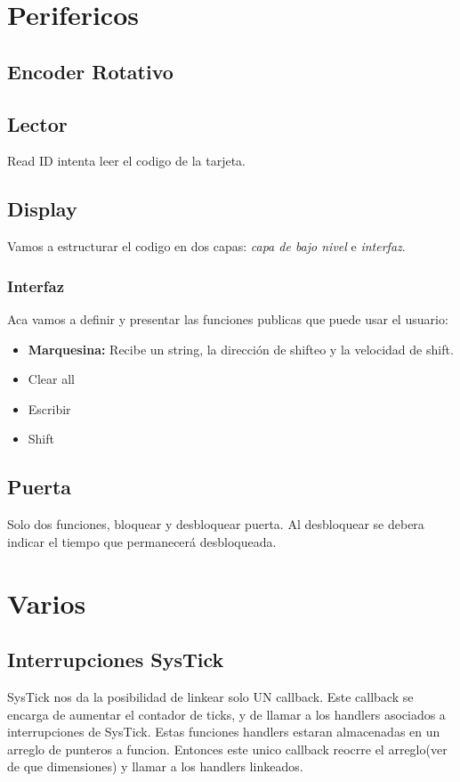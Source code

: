 \documentclass[10pt,a4paper]{article}
\author{Lisandro Alvarez}
\begin{document}
\section{Perifericos}



\subsection{Encoder Rotativo}

\subsection{Lector}
Read ID intenta leer el codigo de la tarjeta. 
\subsection{Display}
Vamos a estructurar el codigo en dos capas: \emph{capa de bajo nivel} e \emph{interfaz}.
\subsubsection{Interfaz}
Aca vamos a definir y presentar las funciones publicas que puede usar el usuario:
\begin{itemize}
\item \textbf{Marquesina: }Recibe un string, la dirección de shifteo y la velocidad de shift. 
\item Clear all
\item Escribir
\item Shift
\end{itemize}
\subsection{Puerta}
Solo dos funciones, bloquear y desbloquear puerta. Al desbloquear se debera indicar el tiempo que permanecerá desbloqueada.
\section{Varios}
\subsection{Interrupciones SysTick}
SysTick nos da la posibilidad de linkear solo UN callback. Este callback se encarga de aumentar el contador de ticks, y de llamar a los handlers asociados a interrupciones de SysTick. Estas funciones handlers estaran almacenadas en un arreglo de punteros a funcion. Entonces este unico callback reocrre el arreglo(ver de que dimensiones) y llamar a los handlers linkeados.
\end{document}
